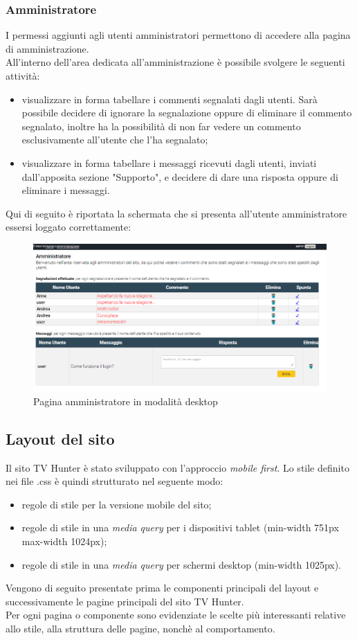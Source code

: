 \subsubsection{Amministratore}
I permessi aggiunti agli utenti amministratori permettono di accedere alla pagina di amministrazione.\\
All'interno dell'area dedicata all'amministrazione è possibile svolgere le seguenti attività:
\begin{itemize}
	\item visualizzare in forma tabellare i commenti segnalati dagli utenti. Sarà possibile decidere di ignorare la segnalazione oppure di eliminare il commento segnalato, inoltre ha la possibilità di non far vedere un commento esclusivamente all'utente che l'ha segnalato;
	\item visualizzare in forma tabellare i messaggi ricevuti dagli utenti, inviati dall'apposita sezione "Supporto", e decidere di dare una risposta oppure di eliminare i messaggi.
\end{itemize}
Qui di seguito è riportata la schermata che si presenta all'utente amministratore essersi loggato correttamente:
\begin{figure}[h!]
	\centerline{\includegraphics[scale=0.45]{img/amministratore.png}}
	\caption{Pagina amministratore in modalità desktop}
	\label{fig:navbarGU}
\end{figure}


\subsection{Layout del sito}
Il sito TV Hunter è stato sviluppato con l'approccio \textit{mobile first}. Lo stile definito nei file .css è quindi strutturato nel seguente modo:
\begin{itemize}
	\item regole di stile per la versione mobile del sito;
	\item regole di stile in una \textit{media query} per i dispositivi tablet (min-width 751px max-width 1024px);
	\item regole di stile in una \textit{media query} per schermi desktop (min-width 1025px).
\end{itemize}
Vengono di seguito presentate prima le componenti principali del layout e successivamente le pagine principali del sito TV Hunter. \\
Per ogni pagina o componente sono evidenziate le scelte più interessanti relative allo stile, alla struttura delle pagine, nonchè al comportamento.

